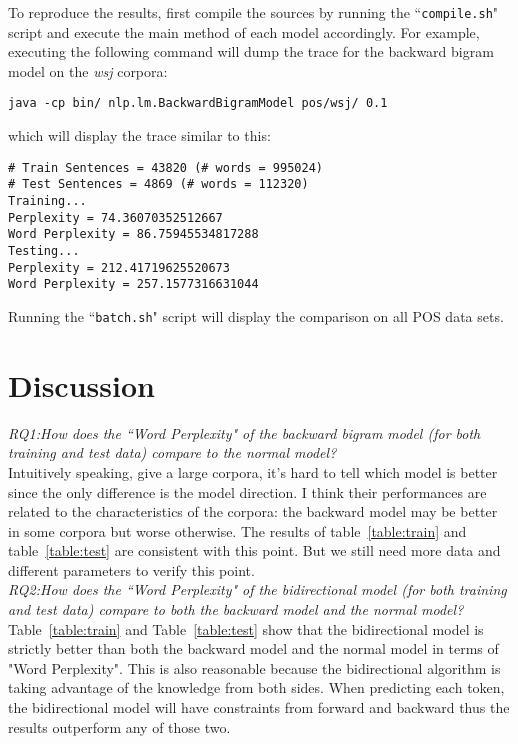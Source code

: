 \documentclass[10pt]{article}
\begin{document}
To reproduce the results, first compile the sources by running the ``\texttt{compile.sh}" script and execute the main method of each model accordingly. For example, executing the following command will dump the trace for the backward bigram model on the \emph{wsj} corpora:
\small
\begin{verbatim}
java -cp bin/ nlp.lm.BackwardBigramModel pos/wsj/ 0.1
\end{verbatim}


which will display the trace similar to this:

\small
\begin{verbatim}
# Train Sentences = 43820 (# words = 995024) 
# Test Sentences = 4869 (# words = 112320)
Training...
Perplexity = 74.36070352512667
Word Perplexity = 86.75945534817288
Testing...
Perplexity = 212.41719625520673
Word Perplexity = 257.1577316631044
\end{verbatim}

Running the ``\texttt{batch.sh}" script will display the comparison on all POS data sets.
\section{Discussion}

\emph{RQ1:How does the ``Word Perplexity" of the backward bigram model (for both training and test data) compare to the normal model?}
\\

Intuitively speaking, give a large corpora, it's hard to tell which model is better since the only difference is the model direction. I think their performances are related to the 
characteristics of the corpora: the backward model may be better in some corpora but worse otherwise. The results of table~\ref{table:train} and table~\ref{table:test} are consistent with this point. But we still need more data and different parameters to verify this point.
\\

\emph{RQ2:How does the ``Word Perplexity" of the bidirectional model (for both training and test data) compare to both the backward model and the normal model?}
\\

Table~\ref{table:train} and Table~\ref{table:test} show that the bidirectional model is strictly better than both the backward model and the normal model in terms of "Word Perplexity". This is also reasonable because the bidirectional algorithm is taking advantage of the knowledge from both sides. When predicting each token, the bidirectional model will have constraints from forward and backward thus the results outperform any of those two. 
\end{document}
